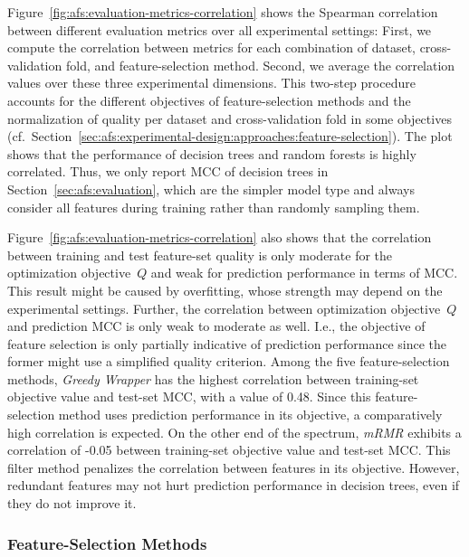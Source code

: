 \documentclass{article}
\theoremstyle{definition}
\begin{document}
Figure~\ref{fig:afs:evaluation-metrics-correlation} shows the Spearman correlation between different evaluation metrics over all experimental settings:
First, we compute the correlation between metrics for each combination of dataset, cross-validation fold, and feature-selection method.
Second, we average the correlation values over these three experimental dimensions.
This two-step procedure accounts for the different objectives of feature-selection methods and the normalization of quality per dataset and cross-validation fold in some objectives (cf.~Section~\ref{sec:afs:experimental-design:approaches:feature-selection}).
The plot shows that the performance of decision trees and random forests is highly correlated.
Thus, we only report MCC of decision trees in Section~\ref{sec:afs:evaluation}, which are the simpler model type and always consider all features during training rather than randomly sampling them.

Figure~\ref{fig:afs:evaluation-metrics-correlation} also shows that the correlation between training and test feature-set quality is only moderate for the optimization objective~$Q$ and weak for prediction performance in terms of MCC.
This result might be caused by overfitting, whose strength may depend on the experimental settings.
Further, the correlation between optimization objective~$Q$ and prediction MCC is only weak to moderate as well.
I.e., the objective of feature selection is only partially indicative of prediction performance since the former might use a simplified quality criterion.
Among the five feature-selection methods, \emph{Greedy Wrapper} has the highest correlation between training-set objective value and test-set MCC, with a value of 0.48.
Since this feature-selection method uses prediction performance in its objective, a comparatively high correlation is expected.
On the other end of the spectrum, \emph{mRMR} exhibits a correlation of -0.05 between training-set objective value and test-set MCC.
This filter method penalizes the correlation between features in its objective.
However, redundant features may not hurt prediction performance in decision trees, even if they do not improve it.

\subsubsection{Feature-Selection Methods}
\label{sec:afs:appendix:evaluation:feature-selection}
\end{document}
